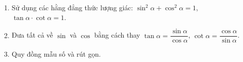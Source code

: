 \begin{enumerate}
\item Sử dụng các hằng đẳng thức lượng giác: $\sin^2\alpha + \cos^2\alpha = 1$, $\tan\alpha \cdot \cot\alpha = 1$.
\item Đưa tất cả về $\sin$ và $\cos$ bằng cách thay $\tan\alpha = \dfrac{\sin\alpha}{\cos\alpha}$, $\cot\alpha = \dfrac{\cos\alpha}{\sin\alpha}$.
\item Quy đồng mẫu số và rút gọn.
\end{enumerate}
